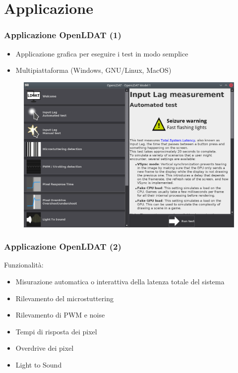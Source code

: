 \documentclass[xcolor={x11names}]{beamer}
\begin{document}
\section{Applicazione}
\begin{frame}
	\frametitle{Applicazione OpenLDAT (1)}
	\begin{itemize}
        \item \alert{Applicazione grafica} per eseguire i test in modo semplice
        \item \alert{Multipiattaforma} (Windows, GNU/Linux, MacOS)
    \end{itemize}
	\begin{figure}
		\includegraphics[height=0.7\textheight]{Applicazione_files/gui_mainMenu2.png}
	\end{figure}
\end{frame}
\begin{frame}
	\frametitle{Applicazione OpenLDAT (2)}
	Funzionalità: \begin{itemize}
		\item Misurazione automatica o interattiva della \alert{latenza totale del sistema}
		\item \alert{Rilevamento del microstuttering}
		\item \alert{Rilevamento di PWM e noise}
		\item \alert{Tempi di risposta dei pixel}
		\item \alert{Overdrive dei pixel}
		\item \alert{Light to Sound}
	\end{itemize}
\end{frame}
\end{document}
